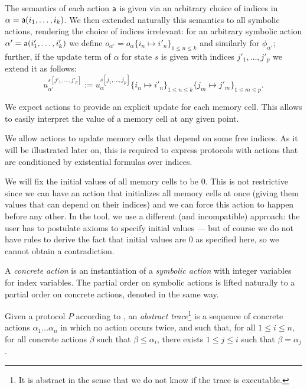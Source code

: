 The semantics of each action $\textsf{a}$ is given via an arbitrary
choice of indices in $\alpha = \textsf{a}(i_1,\ldots,i_k)$.
We then extended naturally this semantics to all symbolic actions,
rendering the choice of indices irrelevant:
for an arbitrary symbolic action $\alpha' =
\textsf{a}(i'_1,\ldots,i'_k)$ we define
$o_{\alpha'} = o_\alpha\{i_n\mapsto i'_n\}_{1\leq n \leq k}$
and similarly for $\phi_{\alpha'}$;
further, if the update term of $\alpha$ for state $s$ is given
with indices $j'_1,\ldots,j'_p$ we extend it as follows:
$$ u_{\alpha'}^{s[j'_1,\ldots,j'_p]} :=
   u_\alpha^{s[j_1,\ldots,j_p]}\{i_n\mapsto i'_n\}_{1 \leq n \leq k}
                                \{j_m\mapsto j'_m\}_{1 \leq m \leq p}.$$

\begin{remark}
  We expect actions to provide an explicit update for each memory cell. This
  allows to easily interpret the value of a memory cell at any given point.

  We allow actions to update memory cells that depend on some free indices.  As
  it will be illustrated later on, this is required to express protocols with
  actions that are conditioned by existential formulas over indices.

  We will fix the initial values of all memory cells to be $0$.
  This is not restrictive since we can have an action that initializes
  all memory cells at once (giving them values that can depend on their
  indices) and we can force this action to happen before any other.
  In the tool, we use a different (and incompatible) approach:
  the user has to postulate axioms to specify initial values
  --- but of course we do not have rules to derive the fact that initial
  values are $0$ as specified here, so we cannot obtain a contradiction.
\end{remark}

\begin{definition}
  A \emph{concrete action} is an instantiation of a \emph{symbolic action}
  with integer variables for index variables. The partial order on symbolic
  actions is lifted naturally to a partial order on concrete actions, denoted
  in the same way.
\end{definition}

\begin{definition}
  \label{def:trace}
  Given a protocol $P$ according to ,
  an \emph{abstract trace}\footnote{
    It is abstract in the sense that we do not know if the trace
    is executable.} is a sequence of concrete actions
  $\alpha_1 \dots \alpha_n$
  in which no action occurs twice, and such that,
  for all $1 \leq i \leq n$,
  for all concrete actions $\beta$ such that $\beta \leq \alpha_i$,
  there exists $1 \leq j \leq i$ such that $\beta = \alpha_j$.
\end{definition}

